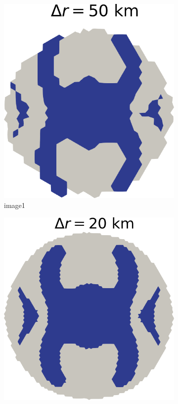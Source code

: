 \documentclass{article}
\begin{document}
\begin{figure}[!h]
	\centering %
	\begin{minipage}[t]{.25\textwidth}
		\begin{subfigure}{\textwidth}
			\includegraphics[width=\linewidth]{../fig/Grounded_zone_50km.png}
			\caption{image1}
			\label{fig:1}
		\end{subfigure}\hfil %
		\begin{subfigure}{\textwidth}
			\includegraphics[width=\linewidth]{../fig/Grounded_zone_20km.png}

\end{subfigure}
\end{minipage}
\end{figure}
\end{document}
